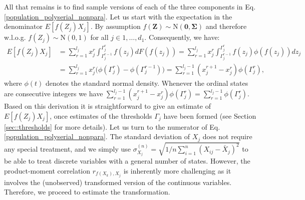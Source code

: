 All that remains is to find sample versions of each of the three components in Eq. \eqref{population_polyserial_nonpara}. Let us start with the expectation in the denominator $E[f(Z_j)X_j]$. By assumption $f(\mathbf{Z}) \sim \text{N}(\mathbf{0},\mathbf{\Sigma})$ and therefore w.l.o.g. $f(Z_j) \sim \text{N}(0,1)$ for all $j \in 1, \dots, d_1$. Consequently, we have:
\begin{equation}
    \begin{split}
        E[f(Z_j)X_j] &= \sum_{r=1}^{l_{j}} x^r_j \int_{\Gamma_j^{r-1}}^{\Gamma_j^{r}} f(z_j) d F(f(z_j)) = \sum_{r=1}^{l_{j}} x^r_j \int_{\Gamma_j^{r-1}}^{\Gamma_j^{r}} f(z_j) \phi(f(z_j)) dz_j \\
        &= \sum_{r=1}^{l_{j}} x^r_j \bigg(\phi(\Gamma_j^r) - \phi(\Gamma_j^{r-1}) \bigg) = \sum_{r=1}^{l_{j}-1} (x^{r+1}_j - x^r_j)\phi(\Gamma_j^r),
    \end{split}
\end{equation}
where $\phi(t)$ denotes the standard normal density. Whenever the ordinal states are consecutive integers we have $\sum_{r=1}^{l_{j}-1} (x^{r+1}_j - x^r_j)\phi(\Gamma_j^r) = \sum_{r=1}^{l_{j}-1}\phi(\Gamma_j^r)$. Based on this derivation it is straightforward to give an estimate of $E[f(Z_j)X_j]$, once estimates of the thresholds $\Gamma_j$ have been formed (see Section \ref{sec::thresholds} for more details). Let us turn to the numerator of Eq. \eqref{population_polyserial_nonpara}. The standard deviation of $X_j$ does not require any special treatment, and we simply use $\sigma^{(n)}_{X_j} = \sqrt{1/n \sum_{i=1}^n (X_{ij} - \bar{X}_{j})^2}$ to be able to treat discrete variables with a general number of states. However, the product-moment correlation $r_{f(X_k), X_j}$ is inherently more challenging as it involves the (unobserved) transformed version of the continuous variables. Therefore, we proceed to estimate the transformation.

